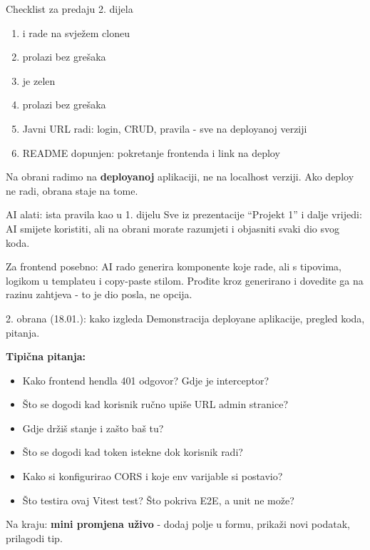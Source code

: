 \begin{frame}{Checklist za predaju 2. dijela}
\begin{enumerate}
  \item {} i  rade na svježem cloneu
  \item {} prolazi bez grešaka
  \item {} je zelen
  \item {} prolazi bez grešaka
  \item Javni URL radi: login, CRUD, pravila - sve na deployanoj verziji
  \item README dopunjen: pokretanje frontenda i link na deploy
\end{enumerate}

\vspace{0.4em}
Na obrani radimo na \textbf{deployanoj} aplikaciji, ne na localhost verziji. Ako deploy ne radi, obrana staje na tome.
\end{frame}


\begin{frame}{AI alati: ista pravila kao u 1. dijelu}
Sve iz prezentacije \enquote{Projekt 1} i dalje vrijedi: AI smijete koristiti, ali na obrani morate razumjeti i objasniti svaki dio svog koda.

\vspace{0.6em}
Za frontend posebno: AI rado generira komponente koje rade, ali s  tipovima, logikom u templateu i copy-paste stilom. Prođite kroz generirano i dovedite ga na razinu zahtjeva - to je dio posla, ne opcija.
\end{frame}

\begin{frame}{2. obrana (18.01.): kako izgleda}
Demonstracija deployane aplikacije, pregled koda, pitanja.

\vspace{0.4em}
\textbf{Tipična pitanja:}
\begin{itemize}
  \item Kako frontend hendla 401 odgovor? Gdje je interceptor?
  \item Što se dogodi kad korisnik ručno upiše URL admin stranice?
  \item Gdje držiš stanje i zašto baš tu?
  \item Što se dogodi kad token istekne dok korisnik radi?
  \item Kako si konfigurirao CORS i koje env varijable si postavio?
  \item Što testira ovaj Vitest test? Što pokriva E2E, a unit ne može?
\end{itemize}

\vspace{0.4em}
Na kraju: \textbf{mini promjena uživo} - dodaj polje u formu, prikaži novi podatak, prilagodi tip.
\end{frame}

